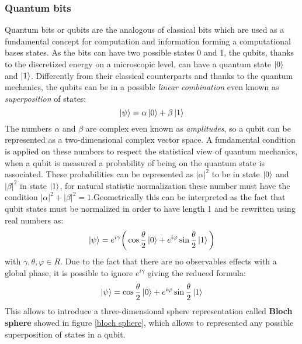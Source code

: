\subsubsection{Quantum bits}
Quantum bits or qubits are the analogous of classical bits which are used as a fundamental concept for computation and information forming a computational bases states. As the bits can have two possible states 0 and 1, the qubits, thanks to the discretized energy on a microscopic level, can have a quantum state $\ket{0}$ and $\ket{1}$. Differently from their classical counterparts and thanks to the quantum mechanics, the qubits can be in a possible \textit{linear combination} even known as \textit{superposition} of states:
\begin{equation}\label{superposition}
	\ket{\psi} = \alpha \ket{0} + \beta \ket{1}
\end{equation}
The numbers $\alpha$ and $\beta$ are complex even known as \textit{amplitudes}, so a qubit can be represented as a two-dimensional complex vector space. A fundamental condition is applied on these numbers to respect the statistical view of quantum mechanics, when a qubit is measured a probability of being on the quantum state is associated. These probabilities can be represented as $|\alpha|^2$ to be in state $\ket{0}$ and $|\beta|^2$ in state $\ket{1}$, for natural statistic normalization these number must have the condition $|\alpha|^2 + |\beta|^2 = 1$.Geometrically this can be interpreted as the fact that qubit states must be normalized in order to have length 1 and be rewritten using real numbers as:
\begin{equation}
	\ket{\psi} = e^{i\gamma} \bigg( \cos{\frac{\theta}{2}} \ket{0} + e^{i\varphi} \sin{\frac{\theta}{2}} \ket{1}\bigg)
\end{equation}
with $\gamma, \theta, \varphi \in R$. Due to the fact that there are no observables effects with a global phase, it is possible to ignore $e^{i\gamma}$ giving the reduced formula:
\begin{equation}\label{angle qubits}
	\ket{\psi} = \cos{\frac{\theta}{2}} \ket{0} + e^{i\varphi} \sin{\frac{\theta}{2}} \ket{1}
\end{equation}
This allows to introduce a three-dimensional sphere representation called \textbf{Bloch sphere} showed in figure \ref{bloch sphere}, which allows to represented any possible superposition of states in a qubit.
